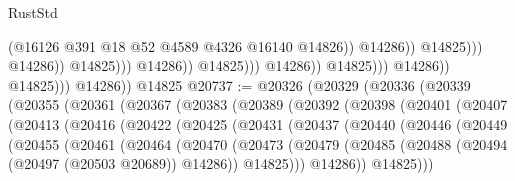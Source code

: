 \begin{lexlean}{RustStd}
\begin{coremodule}
                                                            (@16126
                                                              @391
                                                              @18
                                                              @52
                                                              @4589
                                                              @4326
                                                              @16140
                                                              @14826))
                                                          @14286))
                                                      @14825)))
                                                @14286))
                                            @14825)))
                                      @14286))
                                  @14825)))
                            @14286))
                        @14825)))
                  @14286))
              @14825)))
        @14286))
    @14825
@20737 := @20326
    (@20329
      (@20336
        (@20339
          (@20355
            (@20361
              (@20367
                (@20383
                  (@20389
                    (@20392
                      (@20398
                        (@20401
                          (@20407
                            (@20413
                              (@20416
                                (@20422
                                  (@20425
                                    (@20431
                                      (@20437
                                        (@20440
                                          (@20446
                                            (@20449
                                              (@20455
                                                (@20461
                                                  (@20464
                                                    (@20470
                                                      (@20473
                                                        (@20479
                                                          (@20485
                                                            (@20488
                                                              (@20494
                                                                (@20497 (@20503 @20689))
                                                                @14286))
                                                            @14825)))
                                                      @14286))
                                                  @14825)))

\end{coremodule}
\end{lexlean}
